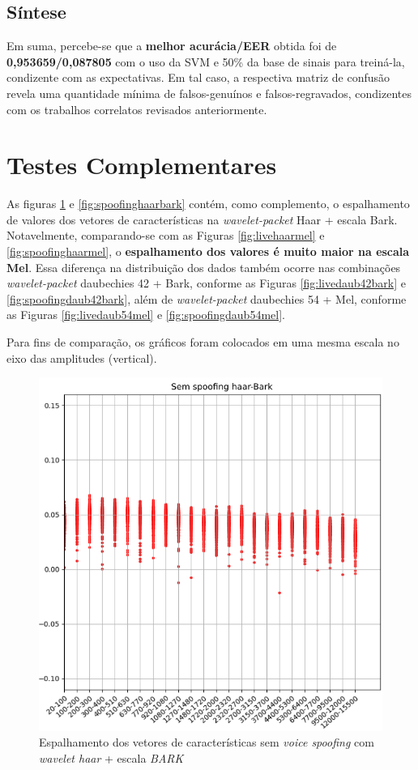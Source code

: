		\subsection{Síntese}
   			\par Em suma, percebe-se que a \textbf{melhor acurácia/EER} obtida foi de \textbf{0,953659/0,087805} com o uso da SVM e 50\% da base de sinais para treiná-la, condizente com as expectativas. Em tal caso, a respectiva matriz de confusão revela uma quantidade mínima de falsos-genuínos e falsos-regravados, condizentes com os trabalhos correlatos revisados anteriormente.

	\section{Testes Complementares}
	\label{chap:testsResults:sec:Experimento05}
		As figuras \ref{fig:livehaarbark} e \ref{fig:spoofinghaarbark} contém, como complemento, o espalhamento de valores dos vetores de características na \textit{wavelet-packet} Haar + escala Bark. Notavelmente, comparando-se com as Figuras \ref{fig:livehaarmel} e \ref{fig:spoofinghaarmel}, o \textbf{espalhamento dos valores é muito maior na escala \textbf{Mel}}. Essa diferença na distribuição dos dados também ocorre nas combinações \textit{wavelet-packet} daubechies 42 + Bark, conforme as Figuras \ref{fig:livedaub42bark} e \ref{fig:spoofingdaub42bark}, além de \textit{wavelet-packet} daubechies 54 + Mel, conforme as Figuras \ref{fig:livedaub54mel} e \ref{fig:spoofingdaub54mel}.
		
		\par Para fins de comparação, os gráficos foram colocados em uma mesma escala no eixo das amplitudes (vertical).
		\begin{figure}[!h]
			\centering
			\includegraphics[width=.70\linewidth, height=.68\linewidth]{images/results/barkVersusMel/liveHaarBark}
			\caption{Espalhamento dos vetores de características sem \textit{voice spoofing} com \textit{wavelet haar} + escala \textit{BARK} }
			\label{fig:livehaarbark}
		\end{figure}
	
